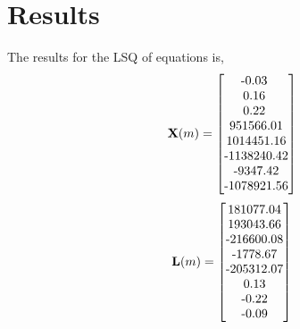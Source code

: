 
\section{Results} %
\label{sec:results}

The results for the LSQ of equations is,
\begin{equation}
	\mathbf{X}(m) = \left[\begin{matrix}
			$-0.03	$						\\	
			$0.16	$						\\  	
			$0.22	$						\\  	
			$951566.01$						\\   	
			$1014451.16$					\\   	
			$-1138240.42$					\\  	
			$-9347.42$						\\  	
			$-1078921.56$					\\  	
		\end{matrix}\right]
	\label{eq:xMatrix}
\end{equation} %
\begin{equation}
	\mathbf{L}(m)= \left[\begin{matrix}
			$181077.04$ 					\\	
			$193043.66$					\\  	
			$-216600.08$					\\  	
			$-1778.67$					\\   	
			$-205312.07$					\\   	
			$0.13$					\\  	
			$-0.22$					\\  	
			$-0.09$					\\  	
		\end{matrix}\right]
	\label{eq:lMatrix}
\end{equation} %
